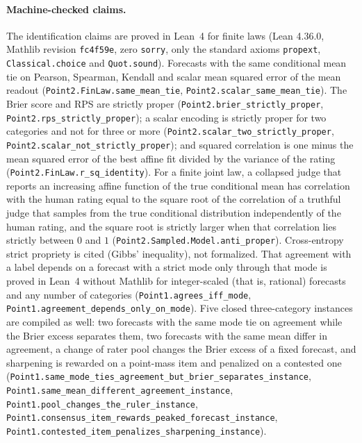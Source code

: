 \paragraph{Machine-checked claims.}
The identification claims are proved in Lean~4 for finite laws (Lean 4.36.0, Mathlib revision \texttt{fc4f59e}, zero \texttt{sorry}, only the standard axioms \texttt{propext}, \texttt{Classical.choice} and \texttt{Quot.sound}).
Forecasts with the same conditional mean tie on Pearson, Spearman, Kendall and scalar mean squared error of the mean readout (\texttt{Point2.FinLaw.same\_\allowbreak mean\_\allowbreak tie}, \texttt{Point2.scalar\_\allowbreak same\_\allowbreak mean\_\allowbreak tie}).
The Brier score and RPS are strictly proper (\texttt{Point2.brier\_\allowbreak strictly\_\allowbreak proper}, \texttt{Point2.rps\_\allowbreak strictly\_\allowbreak proper}); a scalar encoding is strictly proper for two categories and not for three or more (\texttt{Point2.scalar\_\allowbreak two\_\allowbreak strictly\_\allowbreak proper}, \texttt{Point2.scalar\_\allowbreak not\_\allowbreak strictly\_\allowbreak proper}); and squared correlation is one minus the mean squared error of the best affine fit divided by the variance of the rating (\texttt{Point2.FinLaw.r\_\allowbreak sq\_\allowbreak identity}).
For a finite joint law, a collapsed judge that reports an increasing affine function of the true conditional mean has correlation with the human rating equal to the square root of the correlation of a truthful judge that samples from the true conditional distribution independently of the human rating, and the square root is strictly larger when that correlation lies strictly between $0$ and $1$ (\texttt{Point2.Sampled.Model.anti\_\allowbreak proper}).
Cross-entropy strict propriety is cited (Gibbs' inequality), not formalized.
That agreement with a label depends on a forecast with a strict mode only through that mode is proved in Lean~4 without Mathlib for integer-scaled (that is, rational) forecasts and any number of categories (\texttt{Point1.agrees\_\allowbreak iff\_\allowbreak mode}, \texttt{Point1.agreement\_\allowbreak depends\_\allowbreak only\_\allowbreak on\_\allowbreak mode}).
Five closed three-category instances are compiled as well: two forecasts with the same mode tie on agreement while the Brier excess separates them, two forecasts with the same mean differ in agreement, a change of rater pool changes the Brier excess of a fixed forecast, and sharpening is rewarded on a point-mass item and penalized on a contested one (\texttt{Point1.same\_\allowbreak mode\_\allowbreak ties\_\allowbreak agreement\_\allowbreak but\_\allowbreak brier\_\allowbreak separates\_\allowbreak instance}, \texttt{Point1.same\_\allowbreak mean\_\allowbreak different\_\allowbreak agreement\_\allowbreak instance}, \texttt{Point1.pool\_\allowbreak changes\_\allowbreak the\_\allowbreak ruler\_\allowbreak instance}, \texttt{Point1.consensus\_\allowbreak item\_\allowbreak rewards\_\allowbreak peaked\_\allowbreak forecast\_\allowbreak instance}, \texttt{Point1.contested\_\allowbreak item\_\allowbreak penalizes\_\allowbreak sharpening\_\allowbreak instance}).
